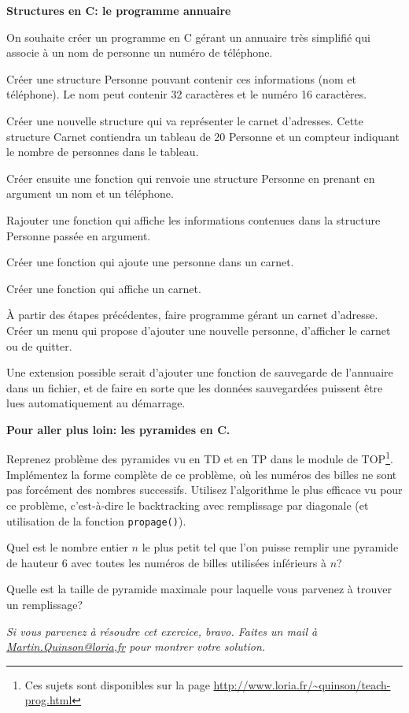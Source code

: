 \documentclass[10pt]{article}\usepackage[correction]{esial}
\begin{document}
\bigskip\Exercice\textbf{Structures en C: le programme annuaire}


On souhaite créer un programme en C gérant un annuaire très simplifié qui
associe à un nom de personne un numéro de téléphone.

\Question Créer une structure Personne pouvant contenir ces informations (nom
et téléphone). Le nom peut contenir 32 caractères et le numéro 16
caractères.

\Question Créer une nouvelle structure qui va représenter le carnet d'adresses.
Cette structure Carnet contiendra un tableau de 20 Personne et un compteur
indiquant le nombre de personnes dans le tableau.

\Question Créer ensuite une fonction qui renvoie une structure Personne en
prenant en argument un nom et un téléphone.

\Question Rajouter une fonction qui affiche les informations contenues dans la
structure Personne passée en argument.

\Question Créer une fonction qui ajoute une personne dans un carnet.

\Question Créer une fonction qui affiche un carnet.

\Question À partir des étapes précédentes, faire programme gérant un carnet
d'adresse. Créer un menu qui propose d'ajouter une nouvelle personne,
d'afficher le carnet ou de quitter.

\medskip
Une extension possible serait d'ajouter une fonction de sauvegarde de
l'annuaire dans un fichier, et de faire en sorte que les données sauvegardées
puissent être lues automatiquement au démarrage. 

\Exercice \textbf{Pour aller plus loin: les pyramides en C.}

Reprenez problème des pyramides vu en TD et en TP dans le module de
TOP\footnote{Ces sujets sont disponibles sur la page
  \url{http://www.loria.fr/~quinson/teach-prog.html}}. Implémentez la forme
complète de ce problème, où les numéros des billes ne sont pas forcément des
nombres successifs. Utilisez l'algorithme le plus efficace vu pour ce problème,
c'est-à-dire le backtracking avec remplissage par diagonale (et utilisation de
la fonction \texttt{propage()}).

\Question Quel est le nombre entier $n$ le plus petit tel que l'on puisse
remplir une pyramide de hauteur 6 avec toutes les numéros de billes utilisées
inférieurs à $n$?

\Question Quelle est la taille de pyramide maximale pour laquelle vous parvenez
à trouver un remplissage? 

\medskip\noindent\textit{Si vous parvenez à résoudre cet exercice,
  bravo. Faites un mail à \url{Martin.Quinson@loria,fr} pour montrer votre
  solution.}
\end{document}
